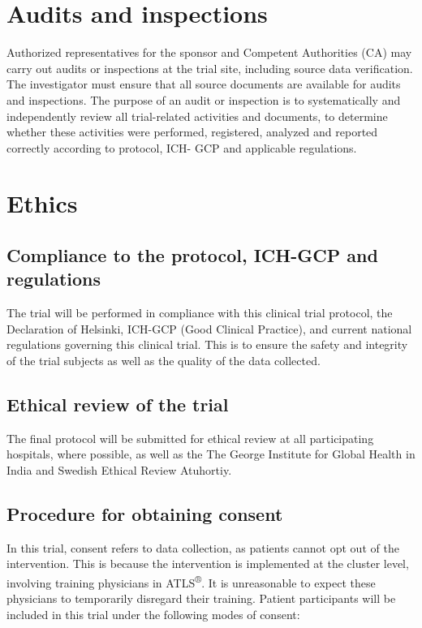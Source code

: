 \documentclass[
]{scrartcl}
\begin{document}
\section{Audits and inspections}\label{audits-and-inspections}

Authorized representatives for the sponsor and Competent Authorities
(CA) may carry out audits or inspections at the trial site, including
source data verification. The investigator must ensure that all source
documents are available for audits and inspections. The purpose of an
audit or inspection is to systematically and independently review all
trial-related activities and documents, to determine whether these
activities were performed, registered, analyzed and reported correctly
according to protocol, ICH- GCP and applicable regulations.

\section{Ethics}\label{ethics}

\subsection{Compliance to the protocol, ICH-GCP and
regulations}\label{compliance-to-the-protocol-ich-gcp-and-regulations}

The trial will be performed in compliance with this clinical trial
protocol, the Declaration of Helsinki, ICH-GCP (Good Clinical Practice),
and current national regulations governing this clinical trial. This is
to ensure the safety and integrity of the trial subjects as well as the
quality of the data collected.

\subsection{Ethical review of the
trial}\label{ethical-review-of-the-trial}

The final protocol will be submitted for ethical review at all
participating hospitals, where possible, as well as the The George
Institute for Global Health in India and Swedish Ethical Review
Atuhortiy.

\subsection{Procedure for obtaining
consent}\label{procedure-for-obtaining-consent}

In this trial, consent refers to data collection, as patients cannot opt
out of the intervention. This is because the intervention is implemented
at the cluster level, involving training physicians in
ATLS\textsuperscript{®}. It is unreasonable to expect these physicians
to temporarily disregard their training. Patient participants will be
included in this trial under the following modes of consent:
\end{document}
